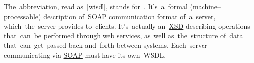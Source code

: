 The~abbreviation, read \mbox{as [wisd\textschwa{}l]}, stands for~.
It's~a~formal (machine--processable) description of~\hyperref[soap]{SOAP} communication format of~a~server, which~the~server provides to~clients.
It's~actually an~\hyperref[xsd]{XSD} describing operations that~can~be performed through \hyperref[webserviceapplication]{web services}, as~well as~the~structure of~data that~can~get~passed back and~forth between systems.
Each~server communicating via \hyperref[soap]{SOAP} must have its own~WSDL\@.
